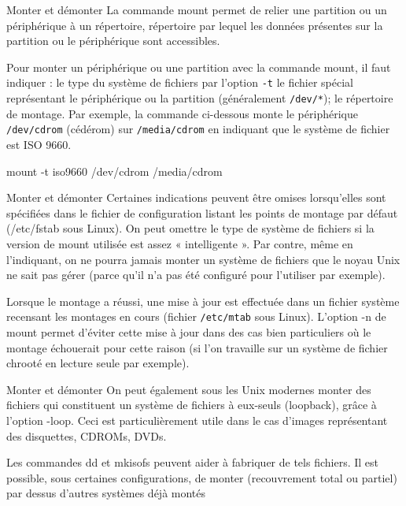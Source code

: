 \documentclass[10pt]{beamer}
\begin{document}
\begin{frame}{Monter et démonter}
La commande \alert{mount} permet de relier une partition ou un périphérique à un répertoire,   répertoire   par   lequel   les   données   présentes   sur   la   partition   ou   le
périphérique sont accessibles.

Pour monter un périphérique ou une partition avec la commande  \alert{mount}, il faut
indiquer : le type du système de fichiers par l'option \texttt{-t} le fichier spécial représentant le périphérique ou la partition (généralement \texttt{/dev/*});
le répertoire de montage. Par exemple, la commande ci-dessous monte le périphérique \texttt{/dev/cdrom} (cédérom) sur \texttt{/media/cdrom} en indiquant que le système
de fichier est ISO 9660.

 \alert{mount -t iso9660 /dev/cdrom /media/cdrom}

\end{frame}

\begin{frame}{Monter et démonter}
Certaines indications peuvent être omises lorsqu'elles sont spécifiées dans le fichier de configuration listant les points de montage par défaut (/etc/fstab sous Linux).
On peut omettre le type de système de fichiers si la version de mount utilisée est
assez « intelligente ». Par contre, même en l'indiquant, on ne pourra jamais monter
un système de fichiers que le noyau Unix ne sait pas gérer (parce qu'il n'a pas été
configuré pour l'utiliser par exemple).

Lorsque le montage a réussi, une mise à jour est effectuée dans un fichier système
recensant les montages en cours (fichier \texttt{/etc/mtab} sous Linux). L'option -n de
mount permet d'éviter cette mise à jour dans des cas bien particuliers où le montage échouerait pour cette raison (si l'on travaille sur un système de fichier chrooté  en lecture seule par exemple).
\end{frame}

\begin{frame}{Monter et démonter}
On peut également sous les Unix modernes monter des fichiers qui constituent un système  de fichiers à eux-seuls (loopback),  grâce à l'option -loop. Ceci est particulièrement utile dans le cas d'images représentant des disquettes, CDROMs, DVDs. 

Les commandes \alert{dd} et \alert{mkisofs} peuvent aider à fabriquer de tels fichiers. Il est possible, sous certaines configurations, de monter (recouvrement total ou partiel) par dessus d'autres systèmes déjà montés
\end{frame}
\end{document}
